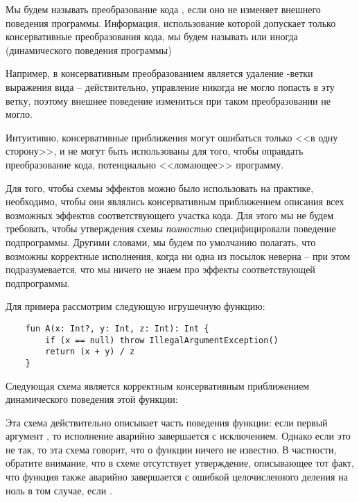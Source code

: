 \begin{definition}
    Мы будем называть преобразование кода , если оно не изменяет внешнего поведения программы. Информация, использование которой допускает только консервативные преобразования кода, мы будем называть  или иногда  (динамического поведения программы)
\end{definition}

Например, в  консервативным преобразованием является удаление -ветки выражения вида  -- действительно, управление никогда не могло попасть в эту ветку, поэтому внешнее поведение измениться при таком преобразовании не могло.

Интуитивно, консервативные приближения могут ошибаться только <<в одну сторону>>, и не могут быть использованы для того, чтобы оправдать преобразование кода, потенциально <<ломающее>> программу. 

Для того, чтобы схемы эффектов можно было использовать на практике, необходимо, чтобы они являлись консервативным приближением описания всех возможных эффектов соответствующего участка кода. Для этого мы не будем требовать, чтобы утверждения схемы \emph{полностью} специфицировали поведение подпрограммы. Другими словами, мы будем по умолчанию полагать, что возможны корректные исполнения, когда ни одна из посылок неверна -- при этом подразумевается, что мы ничего не знаем про эффекты соответствующей подпрограммы. 

Для примера рассмотрим следующую игрушечную функцию:

\begin{verbatim}
    fun A(x: Int?, y: Int, z: Int): Int {
        if (x == null) throw IllegalArgumentException()
        return (x + y) / z
    }
\end{verbatim}

Следующая схема является корректным консервативным приближением динамического поведения этой функции:


Эта схема действительно описывает часть поведения функции: если первый аргумент , то исполнение аварийно завершается с исключением. Однако если это не так, то эта схема говорит, что о функции ничего не известно. В частности, обратите внимание, что в схеме отсутствует утверждение, описывающее тот факт, что функция также аварийно завершается с ошибкой целочисленного деления на ноль в том случае, если .

